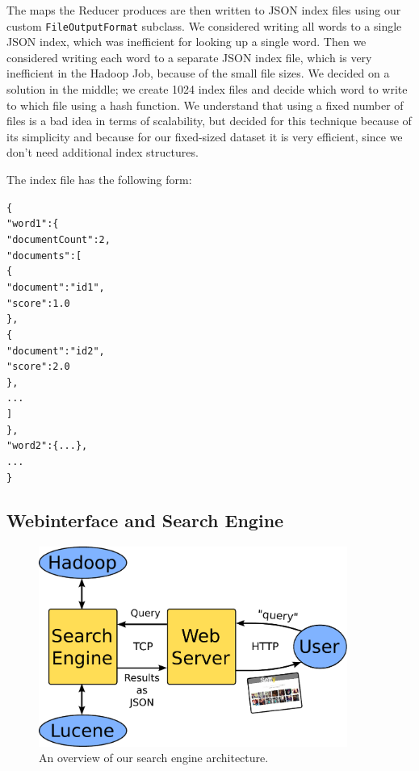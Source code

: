 \documentclass[11pt]{article}
\begin{document}
		The maps the Reducer produces are then written to JSON index files using our custom \texttt{FileOutputFormat} subclass. We considered writing all words to a single JSON index, which was inefficient for looking up a single word. Then we considered writing each word to a separate JSON index file, which is very inefficient in the Hadoop Job, because of the small file sizes. We decided on a solution in the middle; we create 1024 index files and decide which word to write to which file using a hash function. We understand that using a fixed number of files is a bad idea in terms of scalability, but decided for this technique because of its simplicity and because for our fixed-sized dataset it is very efficient, since we don't need additional index structures. 

		The index file has the following form:
		\begin{alltt}
		\{
		    "word1" : \{
		        "documentCount" : 2,
		        "documents": [
		            \{
			            "document" : "id1",
			            "score" : 1.0
		            \},
		            \{
			            "document" : "id2",
		                "score" : 2.0
		            \},
		            ...
		        ]
		    \},
		    "word2" : \{...\},
		    ...
		\}
		\end{alltt}

	\subsection{Webinterface and Search Engine}
		\begin{figure}[h]
			\begin{center}
				\includegraphics[width=0.9\textwidth,keepaspectratio]{architecture.pdf}
			\end{center}
			\caption{An overview of our search engine architecture.}
			\label{fig1}
		\end{figure}
\end{document}
